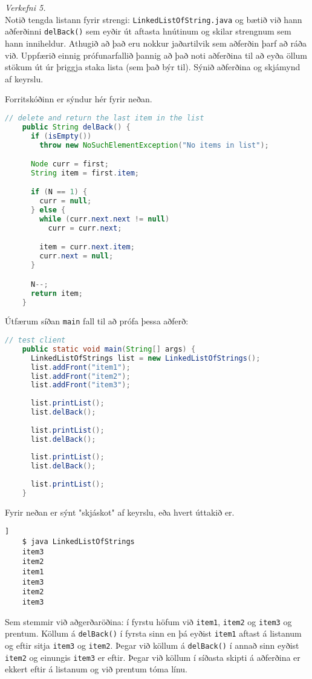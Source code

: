 \documentclass[a4paper, 12pt]{article}
\begin{document}
\newpage
\noindent
\emph{Verkefni 5.} \\
Notið tengda listann fyrir strengi: \texttt{LinkedListOfString.java} og bætið við 
hann aðferðinni \texttt{delBack()} sem eyðir út aftasta hnútinum og skilar strengnum sem 
hann inniheldur.  Athugið að það eru nokkur jaðartilvik sem aðferðin þarf að ráða við.  
Uppfærið einnig prófunarfallið þannig að það noti aðferðina til að eyða öllum stökum út 
úr þriggja staka lista (sem það býr til).  Sýnið aðferðina og skjámynd af keyrslu. 

\begin{description}[leftmargin=!,labelwidth=\widthof{\bfseries Example:},labelindent=0em, ]
  \item[Úrlausn]
  Forritskóðinn er sýndur hér fyrir neðan.
  \begin{lstlisting}[language=java]
    // delete and return the last item in the list
    public String delBack() {
      if (isEmpty())
        throw new NoSuchElementException("No items in list");

      Node curr = first;
      String item = first.item;

      if (N == 1) {
        curr = null;
      } else {
        while (curr.next.next != null)
          curr = curr.next;

        item = curr.next.item;
        curr.next = null;
      }

      N--;
      return item;
    }
  \end{lstlisting}
  Útfærum síðan \texttt{main} fall til að prófa þessa aðferð:
  \begin{lstlisting}[language=java]
    // test client
    public static void main(String[] args) {
      LinkedListOfStrings list = new LinkedListOfStrings();
      list.addFront("item1");
      list.addFront("item2");
      list.addFront("item3");
  
      list.printList();
      list.delBack();
  
      list.printList();
      list.delBack();
  
      list.printList();
      list.delBack();
  
      list.printList();
    }
  \end{lstlisting}
  Fyrir neðan er sýnt "skjáskot" af keyrslu, eða hvert úttakið er.
  \begin{lstlisting}]
    $ java LinkedListOfStrings
    item3
    item2
    item1
    item3
    item2
    item3
  \end{lstlisting}
  Sem stemmir við aðgerðaröðina: í fyrstu höfum við \texttt{item1}, \texttt{item2} og \texttt{item3}
  og prentum. Köllum á \texttt{delBack()} í fyrsta sinn en þá eyðist \texttt{item1} aftast á listanum
  og eftir sitja \texttt{item3} og \texttt{item2}. Þegar við köllum á \texttt{delBack()} í annað sinn eyðist
  \texttt{item2} og einungis \texttt{item3} er eftir. Þegar við köllum í síðasta skipti á aðferðina er ekkert
  eftir á listanum og við prentum tóma línu.


\end{description}
\end{document}
